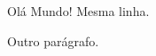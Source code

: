 \documentclass[a4paper, 12pt]{article}
\begin{document}
Olá       Mundo!
Mesma linha.

Outro parágrafo.
\end{document}
